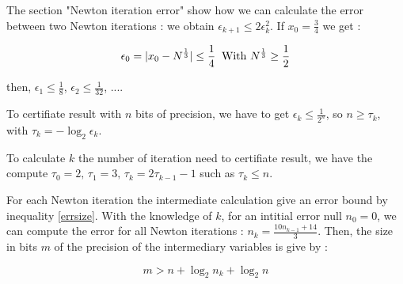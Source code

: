 \documentclass[12pt]{amsart}
\begin{document}
The section "Newton iteration error" show how we can calculate the
error between two Newton iterations : we obtain $\epsilon_{k+1} \leq 2
\epsilon_k^2$.  If $x_0=\frac{3}{4}$ we get :

\[
\epsilon_{0}=|x_0-N^{\frac{1}{3}}|\leq\frac{1}{4}\;\;{\textnormal{With  }}N^{\frac{1}{3}} \geq\frac{1}{2}
\]

then, $\epsilon_1 \leq \frac{1}{8}$, $\epsilon_2 \leq \frac{1}{32}$, ....


To certifiate result with $n$ bits of precision, we have to get $\epsilon_k\leq\frac{1}{2^{n}}$, so $n\geq\tau_k$, with $\tau_k=-\log_2 \epsilon_k$.

To calculate $k$ the number of iteration need to certifiate result, we have the compute $\tau_0=2,\, \tau_1=3,\, \tau_{k}=2\tau_{k-1} -1$ such as $\tau_k \leq n$.

For each Newton iteration the intermediate calculation give an error bound by inequality \ref{errsize}. With the knowledge of $k$, for an intitial error null $n_0=0$, we can compute the error for all Newton iterations : $n_{k} = \frac{10 n_{k-1}+14}{3}$. Then, the size in bits $m$ of the precision of the intermediary variables is give by :

\[
m > n + \log_2 n_k + \log_2 n
\]




\end{document}

